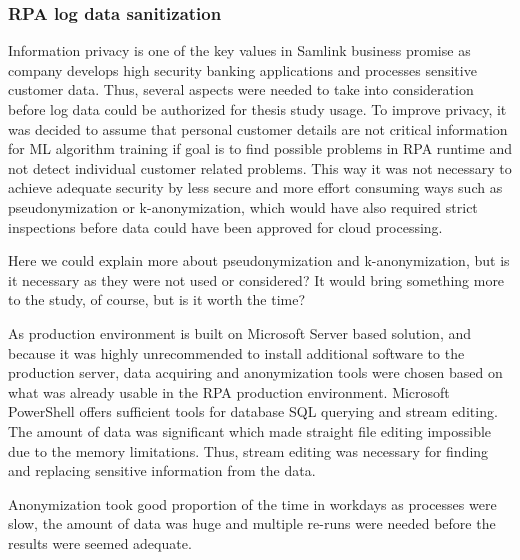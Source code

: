 \subsubsection*{RPA log data sanitization}
Information privacy is one of the key values in Samlink business promise
as company develops high security banking applications
and processes sensitive customer data.
Thus, several aspects were needed to take into consideration
before log data could be authorized for thesis study usage.
To improve privacy,
it was decided to assume
that personal customer details are not critical information
for ML algorithm training
if goal is to find possible problems in RPA runtime
and not detect individual customer related problems.
This way it was not necessary to achieve adequate security
by less secure and more effort consuming ways
such as pseudonymization or k-anonymization,
which would have also required strict inspections
before data could have been approved for cloud processing.
\begin{itcomment}
    Here we could explain more about pseudonymization and k-anonymization,
    but is it necessary as they were not used or considered?
    It would bring something more to the study, of course,
    but is it worth the time?
\end{itcomment}

As production environment is built on Microsoft Server based solution,
and because it was highly unrecommended
to install additional software to the production server,
data acquiring and anonymization tools were chosen
based on what was already usable in the RPA production environment.
Microsoft PowerShell offers sufficient tools
for database SQL querying
and stream editing.
The amount of data was significant
which made straight file editing impossible
due to the memory limitations.
Thus, stream editing was necessary
for finding and replacing
sensitive information from the data.

Anonymization took good proportion of the time in workdays
as processes were slow,
the amount of data was huge
and multiple re-runs were needed
before the results were seemed adequate.



